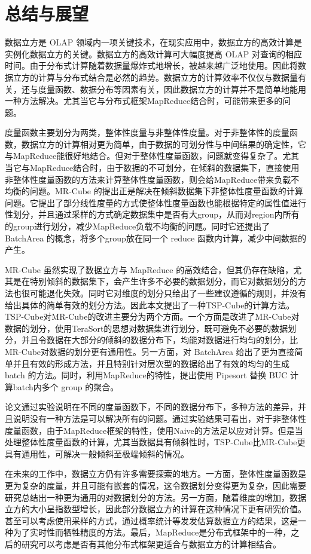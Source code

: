 
\chapter{总结与展望}

数据立方是 OLAP 领域内一项关键技术，在现实应用中，数据立方的高效计算是实例化数据立方的关键。数据立方的高效计算可大幅度提高 OLAP 对查询的相应时间。由于分布式计算随着数据量爆炸式地增长，被越来越广泛地使用。因此将数据立方的计算与分布式结合是必然的趋势。数据立方的计算效率不仅仅与数据量有关，还与度量函数、数据分布等因素有关，因此数据立方的计算并不是简单地能用一种方法解决。尤其当它与分布式框架MapReduce结合时，可能带来更多的问题。

度量函数主要划分为两类，整体性度量与非整体性度量。对于非整体性的度量函数，数据立方的计算相对更为简单，由于数据的可划分性与中间结果的确定性，它与MapReduce能很好地结合。但对于整体性度量函数，问题就变得复杂了。尤其当它与MapReduce结合时，由于数据的不可划分，在倾斜的数据集下，直接使用非整体性度量函数的方法来计算整体性度量函数，则会给MapReduce带来负载不均衡的问题。MR-Cube 的提出正是解决在倾斜数据集下非整体性度量函数的计算问题。它提出了部分线性度量的方式使整体性度量函数也能根据特定的属性值进行性划分，并且通过采样的方式确定数据集中是否有大group，从而对region内所有的group进行划分，减少MapReduce负载不均衡的问题。同时它还提出了 BatchArea 的概念，将多个group放在同一个 reduce 函数内计算，减少中间数据的产生。

MR-Cube 虽然实现了数据立方与 MapReduce 的高效结合，但其仍存在缺陷，尤其是在特别倾斜的数据集下，会产生许多不必要的数据划分，而它对数据划分的方法也很可能退化失效。同时它对维度的划分只给出了一些建议遵循的规则，并没有给出具体的简单有效的划分方法。因此本文提出了一种TSP-Cube的计算方法。TSP-Cube对MR-Cube的改进主要分为两个方面。一个方面是改进了MR-Cube对数据的划分，使用TeraSort的思想对数据集进行划分，既可避免不必要的数据划分，并且令数据在大部分的倾斜的数据分布下，均能对数据进行均匀的划分，比MR-Cube对数据的划分更有通用性。另一方面，对 BatchArea 给出了更为直接简单并且有效的形成方法，并且特别针对层次型的数据给出了有效的均匀的生成 batch 的方法。同时，利用MapReduce的特性，提出使用 Pipesort 替换 BUC 计算batch内多个 group 的聚合。

论文通过实验说明在不同的度量函数下，不同的数据分布下，多种方法的差异，并且说明没有一种方法是可以解决所有的问题。通过实验结果可看出，对于非整体性度量函数，由于MapReduce框架的特性，使用Naive的方法足以应对计算。但是当处理整体性度量函数的计算，尤其当数据具有倾斜性时，TSP-Cube比MR-Cube更具有通用性，可解决一般倾斜至极端倾斜的情况。

在未来的工作中，数据立方仍有许多需要探索的地方。一方面，整体性度量函数是更为复杂的度量，并且可能有嵌套的情况，这令数据划分变得更为复杂，因此需要研究总结出一种更为通用的对数据划分的方法。另一方面，随着维度的增加，数据立方的大小呈指数型增长，因此部分数据立方的计算在这种情况下更有研究价值。甚至可以考虑使用采样的方式，通过概率统计等发发估算数据立方的结果，这是一种为了实时性而牺牲精度的方法。最后，MapReduce是分布式框架中的一种，之后的研究可以考虑是否有其他分布式框架更适合与数据立方的计算相结合。
